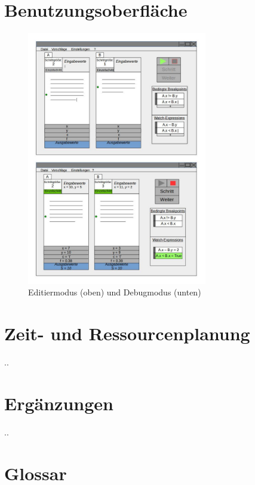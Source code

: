 \documentclass[parskip=full]{scrartcl}
\begin{document}
\newpage
\section{Benutzungsoberfläche}
\begin{figure}[h] 
  \centering
     \includegraphics[width=0.7\textwidth]{skizzeFull}
  \caption{Editiermodus (oben) und Debugmodus (unten)}
  \label{fig:Bild1}
\end{figure}

\section{Zeit- und Ressourcenplanung}
..

\section{Ergänzungen}
..

\section{Glossar}
\end{document}
